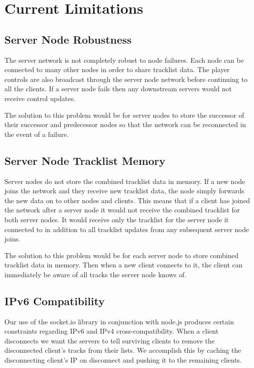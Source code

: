 \documentclass[12pt]{article}
\begin{document}
\section{Current Limitations}

\subsection{Server Node Robustness}
The server network is not completely robust to node failures. Each node can be connected to many other nodes in order to share tracklist data. The player controls are also broadcast through the server node network before continuing to all the clients. If a server node fails then any downstream servers would not receive control updates.

The solution to this problem would be for server nodes to store the successor of their successor and predecessor nodes so that the network can be reconnected in the event of a failure.

\subsection{Server Node Tracklist Memory}
Server nodes do not store the combined tracklist data in memory. If a new node joins the network and they receive new tracklist data, the node simply forwards the new data on to other nodes and clients. This means that if a client has joined the network after a server node it would not receive the combined tracklist for both server nodes. It would receive only the tracklist for the server node it connected to in addition to all tracklist updates from any subsequent server node joins.

The solution to this problem would be for each server node to store combined tracklist data in memory. Then when a new client connects to it, the client can immediately be aware of all tracks the server node knows of.

\subsection{IPv6 Compatibility}
Our use of the socket.io library in conjunction with node.js produces certain constraints regarding IPv6 and IPv4 cross-compatibility.  When a client disconnects we want the servers to tell surviving clients to remove the disconnected client’s tracks from their lists. We accomplish this by caching the disconnecting client’s IP on disconnect and pushing it to the remaining clients.
\end{document}
